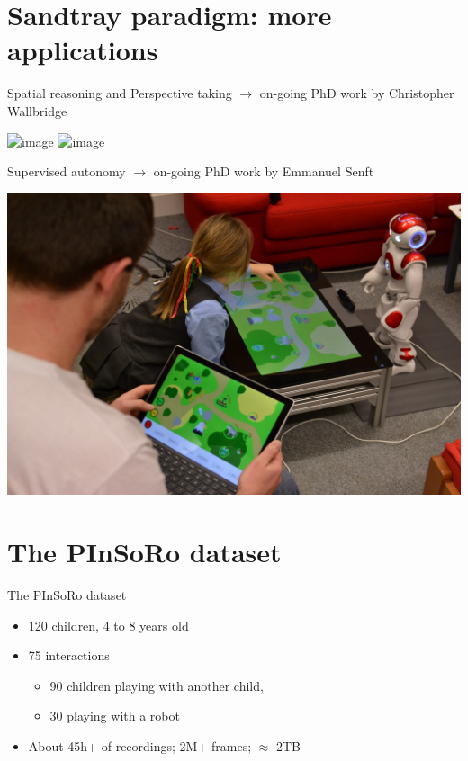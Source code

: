 \documentclass[compress]{beamer}
\begin{document}
\section{Sandtray paradigm: more applications}

\begin{frame}{Spatial reasoning and Perspective taking}
    $\rightarrow$ on-going PhD work by Christopher Wallbridge
    \begin{center}
        \includegraphics<1>[width=0.9\linewidth]{spatial-relations/RefMap}
        \includegraphics<2>[width=0.7\linewidth]{spatial-relations/placementcc}

    \end{center}
\end{frame}


\begin{frame}{Supervised autonomy}
    $\rightarrow$ on-going PhD work by Emmanuel Senft
    \begin{center}
        \includegraphics[width=0.9\linewidth]{sparc/sparc-setup}
    \end{center}
\end{frame}

\section{The PInSoRo dataset}


\begin{frame}{The PInSoRo dataset}
    \begin{itemize}
        \item 120 children, 4 to 8 years old
        \item 75 interactions
            \begin{itemize}
                \item 90 children playing with another child, 
                \item 30 playing with a robot
            \end{itemize}
        \item About 45h+ of recordings; 2M+ frames; $\approx$ 2TB
    \end{itemize}

\end{frame}
\end{document}

